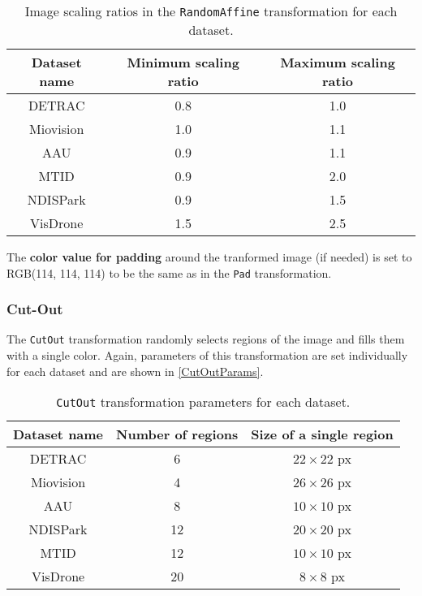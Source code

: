 \begin{table}[h]
\centering
\begin{tabular}{|c|c|c|}
    \hline
    Dataset name & Minimum scaling ratio & Maximum scaling ratio \\
    \hline
    DETRAC       & 0.8 & 1.0 \\
    Miovision    & 1.0 & 1.1 \\
    AAU          & 0.9 & 1.1 \\
    MTID         & 0.9 & 2.0 \\
    NDISPark     & 0.9 & 1.5 \\
    VisDrone     & 1.5 & 2.5 \\
    \hline
\end{tabular}
\caption{Image scaling ratios in the \texttt{RandomAffine} transformation for each dataset.}
\label{RandomAffineScalingRatios}
\end{table}

The \textbf{color value for padding} around the tranformed image (if needed)
is set to RGB(114, 114, 114) to be the same as in the \texttt{Pad} transformation.

\subsubsection*{Cut-Out}

The \texttt{CutOut} transformation randomly selects regions of the image and
fills them with a single color. Again, parameters of this transformation are set
individually for each dataset and are shown in \autoref{CutOutParams}.

\begin{table}[h]
\centering
\begin{tabular}{|c|c|c|}
    \hline
    Dataset name & Number of regions & Size of a single region \\
    \hline
    DETRAC       &  6 & $22 \times 22$ px \\
    Miovision    &  4 & $26 \times 26$ px \\
    AAU          &  8 & $10 \times 10$ px \\
    NDISPark     & 12 & $20 \times 20$ px \\
    MTID         & 12 & $10 \times 10$ px \\
    VisDrone     & 20 & $8 \times 8$ px \\
    \hline
\end{tabular}
\caption{\texttt{CutOut} transformation parameters for each dataset.}
\label{CutOutParams}
\end{table}

